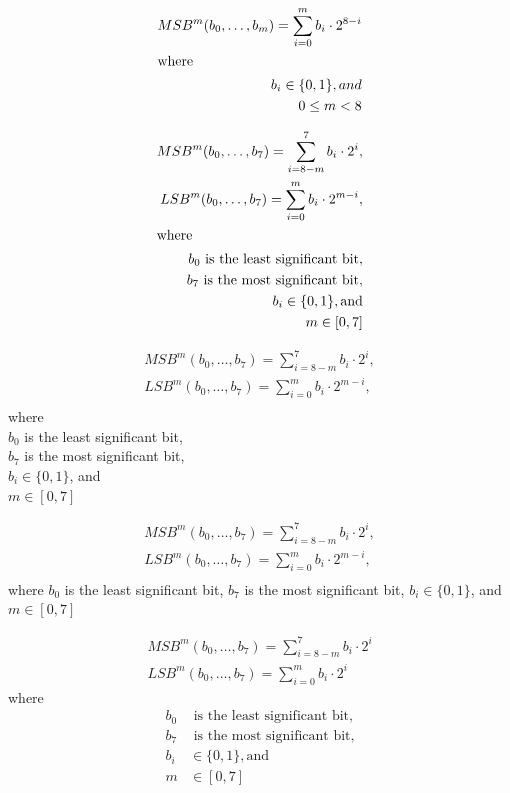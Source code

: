 \begin{align}
	MSB^{m}(b_0, \dots, b_m) = \sum_{i = 0}^m b_i \cdot 2^{8 - i} \\
	\intertext{where}
	 b_i \in \{0, 1\}, and \notag \\
	 0 \leq m < 8 \notag
\end{align}

\begin{align}
	MSB^{m}(b_0, \dots, b_7) = \sum_{i = 8 - m}^7 b_i \cdot 2^i, \\
	LSB^{m}(b_0, \dots, b_7) = \sum_{i = 0}^m b_i \cdot 2^{m - i}, \\
	\intertext{where}
	b_0 \text{ is the least significant bit}, \notag \\
	b_7 \text{ is the most significant bit}, \notag \\
	b_i \in \{0, 1\}, \text{and} \notag \\
	m \in [0, 7] \notag
\end{align}

\begin{align}
	MSB^{m}(b_0, \dots, b_7) = \sum_{i = 8 - m}^7 b_i \cdot 2^i, \\
	LSB^{m}(b_0, \dots, b_7) = \sum_{i = 0}^m b_i \cdot 2^{m - i}, \\
\end{align}
where \\
\qquad $b_0$ is the least significant bit,  \\
\qquad $b_7$ is the most significant bit,  \\
\qquad $b_i \in \{0, 1\}$, and \\
\qquad $m \in [0, 7]$

\begin{align}
	MSB^{m}(b_0, \dots, b_7) = \sum_{i = 8 - m}^7 b_i \cdot 2^i, \\
	LSB^{m}(b_0, \dots, b_7) = \sum_{i = 0}^m b_i \cdot 2^{m - i}, \\
\end{align}
where 
$b_0$ is the least significant bit, 
$b_7$ is the most significant bit,  
$b_i \in \{0, 1\}$, and 
$m \in [0, 7]$

\begin{align}
	MSB^{m}(b_0, \dots, b_7) = \sum_{i = 8 - m}^7 b_i \cdot 2^i \\
	LSB^{m}(b_0, \dots, b_7) = \sum_{i = 0}^m b_i \cdot 2^i 
\end{align}
where
\begin{align*}
	b_0 &\text{ is the least significant bit},  \\
	b_7 &\text{ is the most significant bit},  \\
	b_i &\in \{0, 1\}, \text{and}  \\
	m &\in [0, 7] 
\end{align*}

